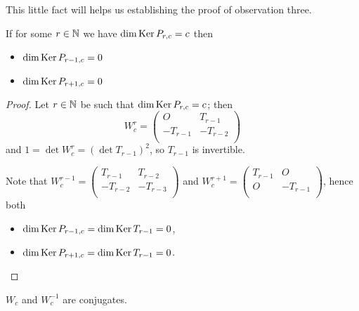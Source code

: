 This little fact will helps us establishing the proof of observation three.

\begin{theorem}
  If for some $r\in\mathbb{N}$ we have $\dim\operatorname{Ker} P_{r,c} = c$ then
  \begin{itemize}
    \item $\dim\operatorname{Ker} P_{r-1,c} = 0$
    \item $\dim\operatorname{Ker} P_{r+1,c} = 0$
  \end{itemize}
\end{theorem}

\begin{proof}
  Let $r\in\mathbb{N}$ be such that $\dim\operatorname{Ker} P_{r,c} = c$; then
  \[
  W_{c}^{r}
  =
  \left(
  \begin{array}{cc}
     O    &  T_{r-1}  \\
    -T_{r-1} & -T_{r-2} \\
  \end{array}
  \right)
  \]
  and $1 = \det W_{c}^{r} = (\det T_{r-1})^{2}$, so $T_{r-1}$ is
  invertible.

  Note that
  $W_{c}^{r-1} = \left(\begin{smallmatrix} T_{r-1} & T_{r-2} \\-T_{r-2} & -T_{r-3} \\\end{smallmatrix}\right)$
  and
  $W_{c}^{r+1} = \left(\begin{smallmatrix} T_{r-1} & O \\ O & -T_{r-1} \\\end{smallmatrix}\right)$,
  hence both
  \begin{itemize}
    \item $\dim\operatorname{Ker} P_{r-1,c} = \dim\operatorname{Ker} T_{r-1} = 0$,
    \item $\dim\operatorname{Ker} P_{r+1,c} = \dim\operatorname{Ker} T_{r-1} = 0$.
  \end{itemize}
\end{proof}

\begin{lemma}
  $W_{c}$ and $W_{c}^{-1}$ are conjugates.
\end{lemma}

